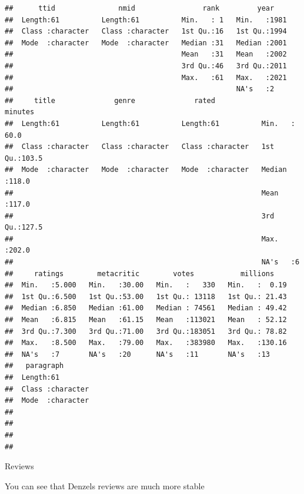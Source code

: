 \documentclass[]{article}
\newenvironment{Shaded}{\begin{snugshade}}{\end{snugshade}}
\newcommand{\DataTypeTok}[1]{\textcolor[rgb]{0.13,0.29,0.53}{#1}}
\newcommand{\DecValTok}[1]{\textcolor[rgb]{0.00,0.00,0.81}{#1}}
\newcommand{\KeywordTok}[1]{\textcolor[rgb]{0.13,0.29,0.53}{\textbf{#1}}}
\newcommand{\NormalTok}[1]{#1}
\newcommand{\OperatorTok}[1]{\textcolor[rgb]{0.81,0.36,0.00}{\textbf{#1}}}
\newcommand{\StringTok}[1]{\textcolor[rgb]{0.31,0.60,0.02}{#1}}
\begin{document}
\begin{verbatim}
##      ttid               nmid                rank         year     
##  Length:61          Length:61          Min.   : 1   Min.   :1981  
##  Class :character   Class :character   1st Qu.:16   1st Qu.:1994  
##  Mode  :character   Mode  :character   Median :31   Median :2001  
##                                        Mean   :31   Mean   :2002  
##                                        3rd Qu.:46   3rd Qu.:2011  
##                                        Max.   :61   Max.   :2021  
##                                                     NA's   :2     
##     title              genre              rated              minutes     
##  Length:61          Length:61          Length:61          Min.   : 60.0  
##  Class :character   Class :character   Class :character   1st Qu.:103.5  
##  Mode  :character   Mode  :character   Mode  :character   Median :118.0  
##                                                           Mean   :117.0  
##                                                           3rd Qu.:127.5  
##                                                           Max.   :202.0  
##                                                           NA's   :6      
##     ratings        metacritic        votes           millions     
##  Min.   :5.000   Min.   :30.00   Min.   :   330   Min.   :  0.19  
##  1st Qu.:6.500   1st Qu.:53.00   1st Qu.: 13118   1st Qu.: 21.43  
##  Median :6.850   Median :61.00   Median : 74561   Median : 49.42  
##  Mean   :6.815   Mean   :61.15   Mean   :113021   Mean   : 52.12  
##  3rd Qu.:7.300   3rd Qu.:71.00   3rd Qu.:183051   3rd Qu.: 78.82  
##  Max.   :8.500   Max.   :79.00   Max.   :383980   Max.   :130.16  
##  NA's   :7       NA's   :20      NA's   :11       NA's   :13      
##   paragraph        
##  Length:61         
##  Class :character  
##  Mode  :character  
##                    
##                    
##                    
## 
\end{verbatim}

Reviews

You can see that Denzels reviews are much more stable

\begin{Shaded}
\end{Shaded}
\end{document}
